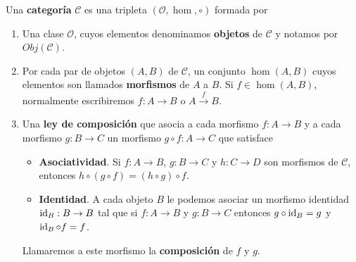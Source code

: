 \begin{definicion}
	Una \textbf{categoría} \(\mathcal{C}\) es una tripleta
	\((\mathcal{O}, \hom, \circ)\) formada por
	\begin{enumerate}
		\item Una clase \(\mathcal{O}\), cuyos elementos denominamos \textbf{objetos} de
			\(\mathcal{C}\) y notamos por \(Obj(\mathcal{C})\).
		\item Por cada par de objetos \((A,B)\) de \(\mathcal{C}\), un conjunto
			\(\hom(A,B)\) cuyos elementos son llamados \textbf{morfismos} de \(A\) a \(B\).
			Si \(f \in \hom(A,B)\), normalmente escribiremos \(f: A \rightarrow B\) o \(A \xrightarrow
			{f}B\).
		\item Una \textbf{ley de composición} que asocia a cada morfismo
			\(f: A \rightarrow B\) y a cada morfismo \(g: B \rightarrow C\) un morfismo
			\(g \circ f : A \rightarrow C\) que satisface
			\begin{itemize}
				\item \textbf{Asociatividad}. Si \(f: A \rightarrow B\),
					\(g: B \rightarrow C\) y \(h : C \rightarrow D\) son morfismos de
					\(\mathcal{C}\), entonces \(h \circ (g \circ f) = (h \circ g) \circ f\).
				\item \textbf{Identidad}. A cada objeto \(B\) le podemos asociar un morfismo
					identidad \(\operatorname{id}_{B} : B \rightarrow B\) tal que si \(f: A \rightarrow B\) y
					\(g: B \rightarrow C\) entonces \(g \circ \operatorname{id}_{B} = g\) y \(\operatorname{id}_{B} \circ f
					= f\).
			\end{itemize}
			Llamaremos a este morfismo la \textbf{composición} de \(f\) y \(g\).
	\end{enumerate}
\end{definicion}

